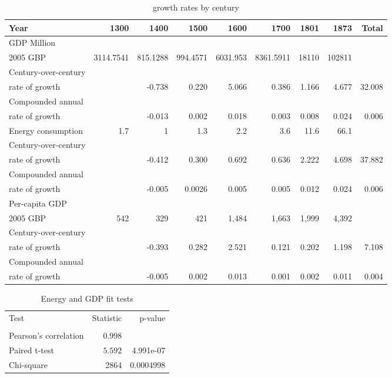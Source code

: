 \documentclass[final]{beamer}
\begin{document}
\begin{frame}
\tiny{
\begin{table}[p!]
\caption{growth rates by century}
\label{tbl:growthByCentury}
\begin{tabular}{lrrrrrrrr}
Year	&	1300	&	1400	&	1500	&	1600	&	1700	&	1801	&	1873&Total	\\
\hline
GDP Million\\ 2005 GBP	&	3114.7541	&	815.1288	&	994.4571	&	6031.953	&	8361.5911	&	18110	&	102811&	\\
Century-over-century\\rate of growth&&-0.738&0.220&5.066&0.386&1.166&4.677&32.008\\
Compounded annual \\rate of growth&&-0.013&0.002&0.018&0.003&0.008&0.024&0.006\\
\hline
Energy consumption&1.7	&	1	&	1.3	&	2.2	&	3.6	&	11.6	&	66.1&	\\
Century-over-century\\rate of growth&&-0.412&0.300&0.692&0.636&2.222&4.698&37.882\\
Compounded annual \\rate of growth&&-0.005&0.0026&0.005&0.005&0.012&0.024&0.006\\
\hline
Per-capita GDP\\2005 GBP&542&  329&  421& 1,484& 1,663& 1,999& 4,392\\
Century-over-century\\rate of growth&&-0.393& 0.282&2.521&0.121&0.202&1.198& 7.108\\
Compounded annual \\rate of growth&&-0.005&0.002&0.013&0.001&0.002& 0.011&0.004\\
\end{tabular}
\end{table}
}
\end{frame}

\begin{frame}
\begin{table}[p!]
\caption{Energy and GDP fit tests}
\label{tbl:fitTest}
\begin{center}
\begin{tabular}{lrr}
\hline\hline
Test&Statistic&p-value\tabularnewline
\multicolumn{1}{c}{}\tabularnewline
\hline
Pearson's correlation&$0.998$&\tabularnewline
\hline
Paired t-test&$5.592$&4.991e-07\tabularnewline
\hline
Chi-square&2864&0.0004998\tabularnewline
\end{tabular}
\end{center}
\end{table}
\end{frame}
\end{document}
